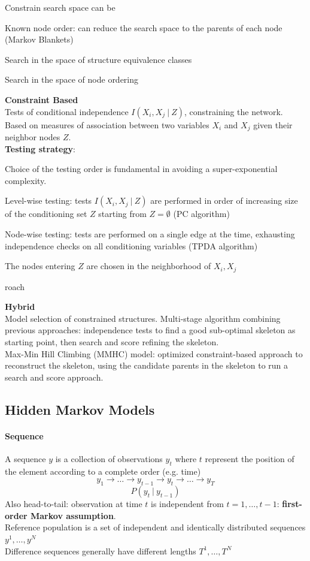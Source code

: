 \documentclass[10pt]{report}
\begin{document}
\begin{list}{}{}
	Constrain search space can be\begin{list}{}{}
		\item Known node order: can reduce the search space to the parents of each node (Markov Blankets)
		\item Search in the space of structure equivalence classes
		\item Search in the space of node ordering
	\end{list}
	\item \textbf{Constraint Based}\\
	Tests of conditional independence $I(X_i,X_j\:|\:Z)$, constraining the network. Based on measures of association between two variables $X_i$ and $X_j$ given their neighbor nodes $Z$.\\
	\textbf{Testing strategy}:\begin{list}{}{}
		\item Choice of the testing order is fundamental in avoiding a super-exponential complexity.
		\item Level-wise testing: tests $I(X_i,X_j\:|\:Z)$ are performed in order of increasing size of the conditioning set $Z$ starting from $Z = \emptyset$ (PC algorithm)
		\item Node-wise testing: tests are performed on a single edge at the time, exhausting independence checks on all conditioning variables (TPDA algorithm)
		\item The nodes entering $Z$ are chosen in the neighborhood of $X_i,X_j$
	\end{list}
roach	\item \textbf{Hybrid}\\
	Model selection of constrained structures. Multi-stage algorithm combining previous approaches: independence tests to find a good sub-optimal skeleton as starting point, then search and score refining the skeleton.\\
	Max-Min Hill Climbing (MMHC) model: optimized constraint-based approach to reconstruct the skeleton, using the candidate parents in the skeleton to run a search and score approach.
\end{list}
\subsection{Hidden Markov Models}
\paragraph{Sequence}A sequence $y$ is a collection of observations $y_t$ where $t$ represent the position of the element according to a complete order (e.g. time)
$$y_1\rightarrow \ldots\rightarrow y_{t-1}\rightarrow y_t\rightarrow\ldots\rightarrow y_T$$
$$P(y_t\:|\:y_{t-1})$$
Also head-to-tail: observation at time $t$ is independent from $t=1,\ldots,t-1$: \textbf{first-order Markov assumption}.\\
Reference population is a set of independent and identically distributed sequences $y^1, \ldots, y^N$\\
Difference sequences generally have different lengths $T^1,\ldots,T^N$
\end{document}
